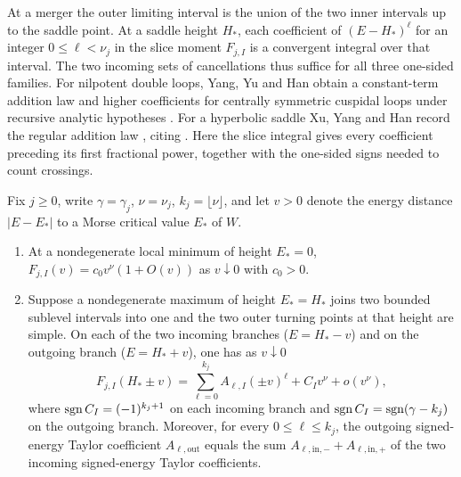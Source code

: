 At a merger the outer limiting interval is the union of the two inner intervals up to the saddle point. At a saddle height \(H_*\), each coefficient of \((E-H_*)^\ell\) for an integer \(0\le\ell<\nu_j\) in the slice moment \(F_{j,I}\) is a convergent integral over that interval. The two incoming sets of cancellations thus suffice for all three one-sided families. For nilpotent double loops, Yang, Yu and Han obtain a constant-term addition law \cite[(3.17)]{YangYuHan2019} and higher coefficients for centrally symmetric cuspidal loops under recursive analytic hypotheses \cite[Theorem~3.1]{YangYuHan2021}. For a hyperbolic saddle Xu, Yang and Han record the regular addition law \cite[(1.5)--(1.6)]{XuYangHan2024}, citing \cite{HanYangLi2023}. Here the slice integral gives every coefficient preceding its first fractional power, together with the one-sided signs needed to count crossings.

\FloatBarrier
\begin{lemma}\label{lem:saddle-singular}
Fix $j\ge 0$, write $\gamma=\gamma_j$, $\nu=\nu_j$, $k_j=\lfloor\nu\rfloor$, and let $v>0$ denote the energy distance $\lvert E-E_*\rvert$ to a Morse critical value $E_*$ of $W$.
\begin{enumerate}[label=(\alph*),nosep]
  \item At a nondegenerate local minimum of height $E_*=0$, $F_{j,I}(v)=c_0 v^\nu(1+O(v))$ as $v\downarrow 0$ with $c_0>0$.
  \item Suppose a nondegenerate maximum of height $E_*=H_*$ joins two bounded sublevel intervals into one and the two outer turning points at that height are simple. On each of the two incoming branches ($E=H_*-v$) and on the outgoing branch ($E=H_*+v$), one has as $v\downarrow 0$
  \begin{equation}\label{eq:local-saddle-jet}
    F_{j,I}(H_*\pm v) = \sum_{\ell=0}^{k_j} A_{\ell,I} (\pm v)^\ell + C_I v^\nu + o(v^\nu),
  \end{equation}
  where $\operatorname{sgn} C_I = (-1)^{k_j+1}$ on each incoming branch and $\operatorname{sgn} C_I = \operatorname{sgn}(\gamma-k_j)$ on the outgoing branch. Moreover, for every $0\le\ell\le k_j$, the outgoing signed-energy Taylor coefficient $A_{\ell,\mathrm{out}}$ equals the sum $A_{\ell,\mathrm{in},-}+A_{\ell,\mathrm{in},+}$ of the two incoming signed-energy Taylor coefficients.
\end{enumerate}
\end{lemma}

